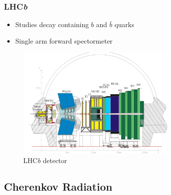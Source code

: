 \documentclass[10pt, xcolor={table}]{beamer}
\begin{document}
\begin{frame}[c]\frametitle{LHC\textit{b}}
    
\begin{itemize}
  \item Studies decay containing $b$ and $\bar{b}$ quarks
  \item Single arm forward spectormeter
\end{itemize}

\begin{figure}
  \centering
  \includegraphics[width=0.7\textwidth]{pics/lhcb_detector.jpg}
  \caption{LHC\textit{b} detector}
  \label{fig:lhcb}
\end{figure}
\end{frame}


\subsection{Cherenkov Radiation} %
\label{sub:cherenkov_radiation}
\end{document}

